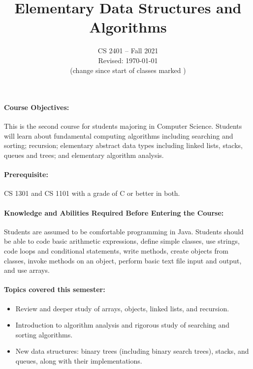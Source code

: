 \documentclass[12pt]{scrartcl}
\title{Elementary Data Structures and Algorithms}\let\Title\@title
\subtitle{
{\small
\begin{tabular}{cc}
Dr. Dan DeBlasio & Marissa Stephens\\
Department of Computer Science  & Google\\
University of Texas at El Paso\\
\end{tabular}
}
\vskip-1cm}
\date{\small CS 2401 -- Fall 2021\\ \vspace{1em}Revised: \today\\(change since start of classes marked \change{}{in orange})}
\begin{document}

\maketitle
%
%
\paragraph{Course Objectives:} This is the second course for students majoring in Computer Science. Students will learn about fundamental computing algorithms including searching and sorting; recursion; elementary abstract data types including linked lists, stacks, queues and trees; and elementary algorithm analysis. 
\tagmcend

\paragraph{Prerequisite:} CS 1301 and CS 1101 with a grade of C or better in both. 

\paragraph{Knowledge and Abilities Required Before Entering the Course:} Students are assumed to be comfortable programming in Java. Students should be able to code basic arithmetic expressions, define simple classes, use strings, code loops and conditional statements, write methods, create objects from classes, invoke methods on an object, perform basic text file input and output, and use arrays.

\paragraph{Topics covered this semester:}
\begin{itemize} 
\item Review and deeper study of arrays, objects, linked lists, and recursion. 
\item Introduction to algorithm analysis and rigorous study of searching and sorting algorithms. 
\item New data structures: binary trees (including binary search trees), stacks, and queues, along with their implementations. 
\end{itemize}
\end{document}
